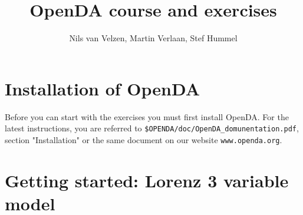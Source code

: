 \documentclass[a4paper,10pt]{article}
\title{OpenDA course and exercises}
\author{Nils van Velzen, Martin Verlaan, Stef Hummel}
\begin{document}

\maketitle



\section*{Installation of OpenDA}
Before you can start with the exercises you must first install OpenDA. For the
latest instructions, you are referred to \verb|$OPENDA/doc/OpenDA_domunentation.pdf|, 
section "Installation" or the same document on our website \verb|www.openda.org|.

\section{Getting started: Lorenz 3 variable model}

\end{document}
